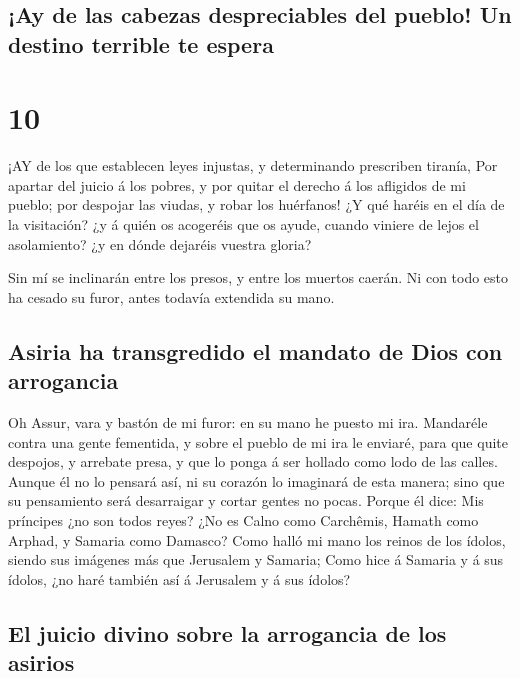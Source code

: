 \hypertarget{ay-de-las-cabezas-despreciables-del-pueblo-un-destino-terrible-te-espera}{%
\subsection{¡Ay de las cabezas despreciables del pueblo! Un destino
terrible te
espera}\label{ay-de-las-cabezas-despreciables-del-pueblo-un-destino-terrible-te-espera}}

\hypertarget{section-9}{%
\section{10}\label{section-9}}

 ¡AY de los que establecen leyes injustas, y determinando
prescriben tiranía,  Por apartar del juicio á los pobres, y
por quitar el derecho á los afligidos de mi pueblo; por despojar las
viudas, y robar los huérfanos!  ¿Y qué haréis en el día de
la visitación? ¿y á quién os acogeréis que os ayude, cuando viniere de
lejos el asolamiento? ¿y en dónde dejaréis vuestra gloria?

 Sin mí se inclinarán entre los presos, y entre los muertos
caerán. Ni con todo esto ha cesado su furor, antes todavía extendida su
mano.

\hypertarget{asiria-ha-transgredido-el-mandato-de-dios-con-arrogancia}{%
\subsection{Asiria ha transgredido el mandato de Dios con
arrogancia}\label{asiria-ha-transgredido-el-mandato-de-dios-con-arrogancia}}

 Oh Assur, vara y bastón de mi furor: en su mano he puesto
mi ira.  Mandaréle contra una gente fementida, y sobre el
pueblo de mi ira le enviaré, para que quite despojos, y arrebate presa,
y que lo ponga á ser hollado como lodo de las calles. 
Aunque él no lo pensará así, ni su corazón lo imaginará de esta manera;
sino que su pensamiento será desarraigar y cortar gentes no pocas.
 Porque él dice: Mis príncipes ¿no son todos reyes?
 ¿No es Calno como Carchêmis, Hamath como Arphad, y Samaria
como Damasco?  Como halló mi mano los reinos de los ídolos,
siendo sus imágenes más que Jerusalem y Samaria;  Como hice
á Samaria y á sus ídolos, ¿no haré también así á Jerusalem y á sus
ídolos?

\hypertarget{el-juicio-divino-sobre-la-arrogancia-de-los-asirios}{%
\subsection{El juicio divino sobre la arrogancia de los
asirios}\label{el-juicio-divino-sobre-la-arrogancia-de-los-asirios}}

